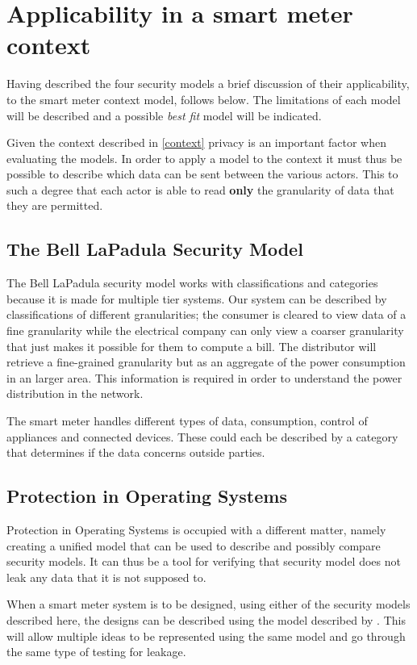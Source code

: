 \section{Applicability in a smart meter context}
Having described the four security models a brief discussion of their applicability, to the smart meter context model, follows below.
The limitations of each model will be described and a possible \emph{best fit} model will be indicated.

Given the context described in \cref{context} privacy is an important factor when evaluating the models.
In order to apply a model to the context it must thus be possible to describe which data can be sent between the various actors.
This to such a degree that each actor is able to read \textbf{only} the granularity of data that they are permitted.

\subsection{The Bell LaPadula Security Model}
The Bell LaPadula security model works with classifications and categories because it is made for multiple tier systems.
Our system can be described by classifications of different granularities; the consumer is cleared to view data of a fine granularity while the electrical company can only view a coarser granularity that just makes it possible for them to compute a bill.
The distributor will retrieve a fine-grained granularity but as an aggregate of the power consumption in an larger area.
This information is required in order to understand the power distribution in the network.

The smart meter handles different types of data, consumption, control of appliances and connected devices.
These could each be described by a category that determines if the data concerns outside parties.

\subsection{Protection in Operating Systems}
Protection in Operating Systems is occupied with a different matter, namely creating a unified model that can be used to describe and possibly compare security models.
It can thus be a tool for verifying that security model does not leak any data that it is not supposed to.

When a smart meter system is to be designed, using either of the security models described here, the designs can be described using the model described by \citet{HRU}.
This will allow multiple ideas to be represented using the same model and go through the same type of testing for leakage.

